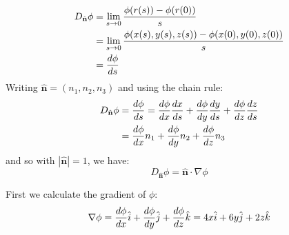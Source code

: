 \documentclass[a4paper, 10pt]{article}
\begin{document}
\begin{align*}
  D_{\hat{\mathbf{n}}} \phi & = \lim_{s \to 0} \frac{\phi(r(s)) - \phi(r(0))}{s}                         \\
                            & = \lim_{s \to 0} \frac{\phi(x(s), y(s), z(s)) - \phi(x(0), y(0), z(0))}{s} \\
                            & = \frac{d\phi}{ds}
\end{align*}
Writing $\hat{\mathbf{n}} = (n_1, n_2, n_3)$ and using the chain rule:
\begin{align}
  D_{\hat{\mathbf{n}}} \phi & = \frac{d\phi}{ds} = \frac{d\phi}{dx} \frac{dx}{ds} + \frac{d\phi}{dy} \frac{dy}{ds} + \frac{d\phi}{dz} \frac{dz}{ds} \nonumber \\
                            & = \frac{d\phi}{dx} n_1 + \frac{d\phi}{dy} n_2 + \frac{d\phi}{dz} n_3
\end{align}
and so with $|\hat{\mathbf{n}}| = 1$, we have:
$$D_{\hat{\mathbf{n}}} \phi = \hat{\mathbf{n}} \cdot \nabla \phi $$

\begin{examplebox}[Find the directional derivative of $\phi(x,y,z) = 2x^2 + 3y^2 + z^2$ at the point
    $P: : (2,1,3)$ in the direction of the vector $\vec{a} = \hat{i} - 2\hat{k}$]
  First we calculate the gradient of $\phi$:
  $$\nabla \phi = \frac{d\phi}{dx} \hat{i} + \frac{d\phi}{dy} \hat{j} + \frac{d\phi}{dz} \hat{k} = 4x \hat{i} + 6y \hat{j} + 2z \hat{k}$$
\end{examplebox}
\end{document}
